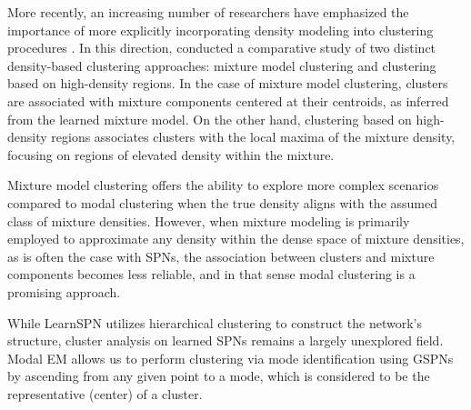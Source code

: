 More recently, an increasing number of researchers have emphasized the importance of more explicitly incorporating density modeling into clustering procedures \citep{Carlsson2013}. In this direction, \citet{Chacon2019} conducted a comparative study of two distinct density-based clustering approaches: mixture model clustering and clustering based on high-density regions. In the case of mixture model clustering, clusters are associated with mixture components centered at their centroids, as inferred from the learned mixture model. On the other hand, clustering based on high-density regions associates clusters with the local maxima of the mixture density, focusing on regions of elevated density within the mixture.

Mixture model clustering offers the ability to explore more complex scenarios compared to modal clustering when the true density aligns with the assumed class of mixture densities. However, when mixture modeling is primarily employed to approximate any density within the dense space of mixture densities, as is often the case with SPNs, the association between clusters and mixture components becomes less reliable, and in that sense modal clustering is a promising approach.

While LearnSPN utilizes hierarchical clustering to construct the network's structure, cluster analysis on learned SPNs remains a largely unexplored field. Modal EM allows us to perform clustering via mode identification using GSPNs by ascending from any given point to a mode, which is considered to be the representative (center) of a cluster.
